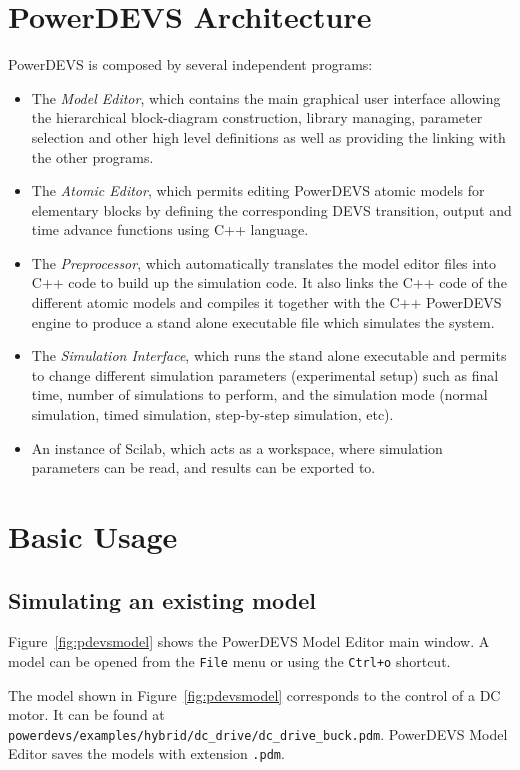 \section{PowerDEVS Architecture}
PowerDEVS is composed by several independent programs:
\begin{itemize}
  \item The {\it Model Editor}, which contains the main graphical user interface allowing the hierarchical block-diagram construction, library managing, parameter selection and other high level definitions as well as providing the linking with the other programs.

  \item The {\it Atomic Editor}, which permits editing PowerDEVS atomic models for elementary blocks by defining the corresponding DEVS transition, output and time advance functions using C++ language.

  \item The {\it Preprocessor}, which automatically translates the model editor files into C++ code to build up the simulation code. It also links the C++ code of the different atomic models and compiles it together with the C++ PowerDEVS engine to produce a stand alone executable file which simulates the system.

   \item The {\it Simulation Interface}, which runs the stand alone executable and permits to change different simulation parameters (experimental setup) such as final time, number of simulations to perform, and the simulation mode (normal simulation, timed simulation, step-by-step simulation, etc).

   \item An instance of Scilab, which acts as a workspace, where simulation parameters can be read, and results can be exported to.
\end{itemize}

\section{Basic Usage}\label{sec:basic_usage}
\subsection*{Simulating an existing model}
Figure~\ref{fig:pdevsmodel} shows the PowerDEVS Model Editor main window. A model can be opened from the \verb"File" menu or using the \verb"Ctrl+o" shortcut.

The model shown in Figure~\ref{fig:pdevsmodel} corresponds to the control of a DC motor. It can be found at \verb"powerdevs/examples/hybrid/dc_drive/dc_drive_buck.pdm". PowerDEVS Model Editor saves the models with extension \verb".pdm".

